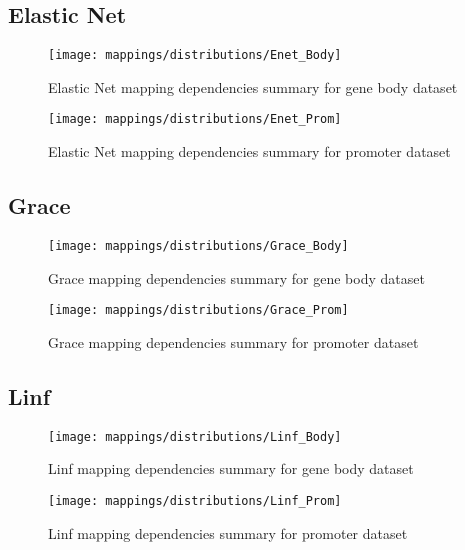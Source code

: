 \pagebreak
\subsection{Elastic Net}

\begin{figure}[H]
	\centering
	\texttt{[image: mappings/distributions/Enet\_Body]}
	\caption{Elastic Net mapping dependencies summary for gene body dataset}
	\label{fig:map_body_enet}
\end{figure}

\begin{figure}[H]
	\centering
	\texttt{[image: mappings/distributions/Enet\_Prom]}
	\caption{Elastic Net mapping dependencies summary for promoter dataset}
	\label{fig:map_prom_enet}
\end{figure}


\pagebreak
\subsection{Grace}

\begin{figure}[H]
	\centering
	\texttt{[image: mappings/distributions/Grace\_Body]}
	\caption{Grace mapping dependencies summary for gene body dataset}
	\label{fig:map_body_grace}
\end{figure}

\begin{figure}[H]
	\centering
	\texttt{[image: mappings/distributions/Grace\_Prom]}
	\caption{Grace mapping dependencies summary for promoter dataset}
	\label{fig:map_prom_grace}
\end{figure}


\pagebreak
\subsection{Linf}

\begin{figure}[H]
	\centering
	\texttt{[image: mappings/distributions/Linf\_Body]}
	\caption{Linf mapping dependencies summary for gene body dataset}
	\label{fig:map_body_linf}
\end{figure}

\begin{figure}[H]
	\centering
	\texttt{[image: mappings/distributions/Linf\_Prom]}
	\caption{Linf mapping dependencies summary for promoter dataset}
	\label{fig:map_prom_linf}
\end{figure}


